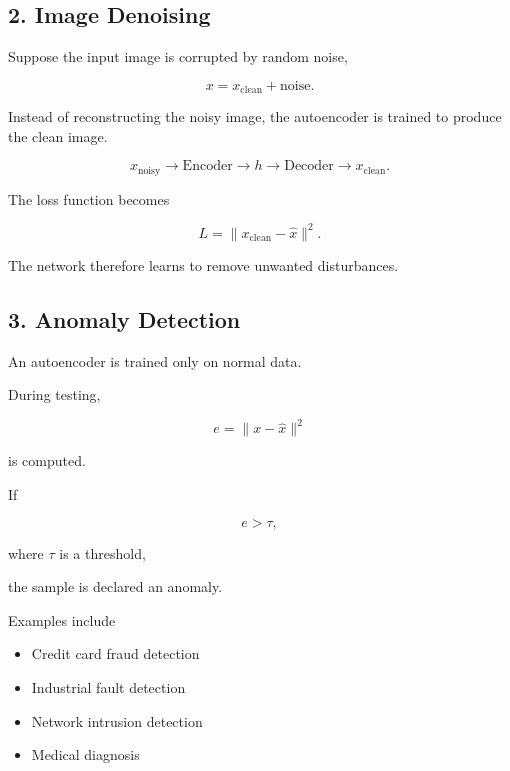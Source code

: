 \documentclass{article}
\begin{document}
	\subsection{2. Image Denoising}
	
	Suppose the input image is corrupted by random noise,
	
	\[
	x=x_{\text{clean}}+\text{noise}.
	\]
	
	Instead of reconstructing the noisy image, the autoencoder is trained to
	produce the clean image.
	
	\[
	x_{\text{noisy}}
	\longrightarrow
	\text{Encoder}
	\longrightarrow
	h
	\longrightarrow
	\text{Decoder}
	\longrightarrow
	x_{\text{clean}}.
	\]
	
	The loss function becomes
	
	\[
	\boxed{
		L
		=
		\|x_{\text{clean}}
		-
		\hat{x}\|^2.
	}
	\]
	
	The network therefore learns to remove unwanted disturbances.
	
	\subsection{3. Anomaly Detection}
	
	An autoencoder is trained only on normal data.
	
	During testing,
	
	\[
	e
	=
	\|x-\hat{x}\|^2
	\]
	
	is computed.
	
	If
	
	\[
	e>\tau,
	\]
	
	where $\tau$ is a threshold,
	
	the sample is declared an anomaly.
	
	Examples include
	
	\begin{itemize}
		\item Credit card fraud detection
		\item Industrial fault detection
		\item Network intrusion detection
		\item Medical diagnosis
	\end{itemize}
	
\end{document}
